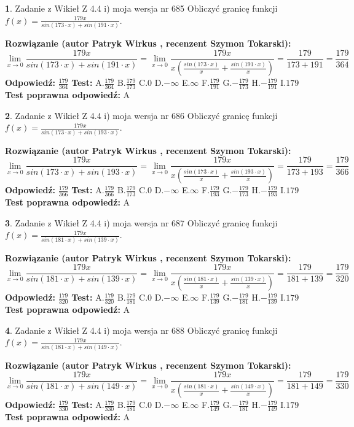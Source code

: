 \documentclass[12pt, a4paper]{article}
\theoremstyle{definition} %
\newtheorem{zad}{}
\newcommand{\zadStart}[1]{\begin{zad}#1\newline}
\newcommand{\zadStop}{\end{zad}}
\newcommand{\rozwStart}[2]{\noindent \textbf{Rozwiązanie (autor #1 , recenzent #2): }\newline}
\newcommand{\rozwStop}{\newline}
\newcommand{\odpStart}{\noindent \textbf{Odpowiedź:}\newline}
\newcommand{\odpStop}{\newline}
\newcommand{\testStart}{\noindent \textbf{Test:}\newline}
\newcommand{\testStop}{\newline}
\newcommand{\kluczStart}{\noindent \textbf{Test poprawna odpowiedź:}\newline}
\newcommand{\kluczStop}{\newline}
\begin{document}
\zadStart{Zadanie z Wikieł Z 4.4 i) moja wersja nr 685}
Obliczyć granicę funkcji $f(x)=\frac{179x}{sin(173\cdot x) +sin(191\cdot x)}$.
\zadStop
\rozwStart{Patryk Wirkus}{Szymon Tokarski}
$$\lim\limits_{x\to 0}\frac{179x}{sin(173\cdot x) +sin(191\cdot x)}=\lim\limits_{x\to 0}\frac{179x}{x(\frac{sin(173\cdot x)}{x}+\frac{sin(191\cdot x)}{x})}=\frac{179}{173+191} = \frac{179}{364}$$
\rozwStop
\odpStart
$\frac{179}{364}$
\odpStop
\testStart
A.$\frac{179}{364}$
B.$\frac{179}{173}$
C.$0$
D.$-\infty$
E.$\infty$
F.$\frac{179}{191}$
G.$-\frac{179}{173}$
H.$-\frac{179}{191}$
I.$179$
\testStop
\kluczStart
A
\kluczStop



\zadStart{Zadanie z Wikieł Z 4.4 i) moja wersja nr 686}
Obliczyć granicę funkcji $f(x)=\frac{179x}{sin(173\cdot x) +sin(193\cdot x)}$.
\zadStop
\rozwStart{Patryk Wirkus}{Szymon Tokarski}
$$\lim\limits_{x\to 0}\frac{179x}{sin(173\cdot x) +sin(193\cdot x)}=\lim\limits_{x\to 0}\frac{179x}{x(\frac{sin(173\cdot x)}{x}+\frac{sin(193\cdot x)}{x})}=\frac{179}{173+193} = \frac{179}{366}$$
\rozwStop
\odpStart
$\frac{179}{366}$
\odpStop
\testStart
A.$\frac{179}{366}$
B.$\frac{179}{173}$
C.$0$
D.$-\infty$
E.$\infty$
F.$\frac{179}{193}$
G.$-\frac{179}{173}$
H.$-\frac{179}{193}$
I.$179$
\testStop
\kluczStart
A
\kluczStop



\zadStart{Zadanie z Wikieł Z 4.4 i) moja wersja nr 687}
Obliczyć granicę funkcji $f(x)=\frac{179x}{sin(181\cdot x) +sin(139\cdot x)}$.
\zadStop
\rozwStart{Patryk Wirkus}{Szymon Tokarski}
$$\lim\limits_{x\to 0}\frac{179x}{sin(181\cdot x) +sin(139\cdot x)}=\lim\limits_{x\to 0}\frac{179x}{x(\frac{sin(181\cdot x)}{x}+\frac{sin(139\cdot x)}{x})}=\frac{179}{181+139} = \frac{179}{320}$$
\rozwStop
\odpStart
$\frac{179}{320}$
\odpStop
\testStart
A.$\frac{179}{320}$
B.$\frac{179}{181}$
C.$0$
D.$-\infty$
E.$\infty$
F.$\frac{179}{139}$
G.$-\frac{179}{181}$
H.$-\frac{179}{139}$
I.$179$
\testStop
\kluczStart
A
\kluczStop



\zadStart{Zadanie z Wikieł Z 4.4 i) moja wersja nr 688}
Obliczyć granicę funkcji $f(x)=\frac{179x}{sin(181\cdot x) +sin(149\cdot x)}$.
\zadStop
\rozwStart{Patryk Wirkus}{Szymon Tokarski}
$$\lim\limits_{x\to 0}\frac{179x}{sin(181\cdot x) +sin(149\cdot x)}=\lim\limits_{x\to 0}\frac{179x}{x(\frac{sin(181\cdot x)}{x}+\frac{sin(149\cdot x)}{x})}=\frac{179}{181+149} = \frac{179}{330}$$
\rozwStop
\odpStart
$\frac{179}{330}$
\odpStop
\testStart
A.$\frac{179}{330}$
B.$\frac{179}{181}$
C.$0$
D.$-\infty$
E.$\infty$
F.$\frac{179}{149}$
G.$-\frac{179}{181}$
H.$-\frac{179}{149}$
I.$179$
\testStop
\kluczStart
A
\kluczStop
\end{document}
